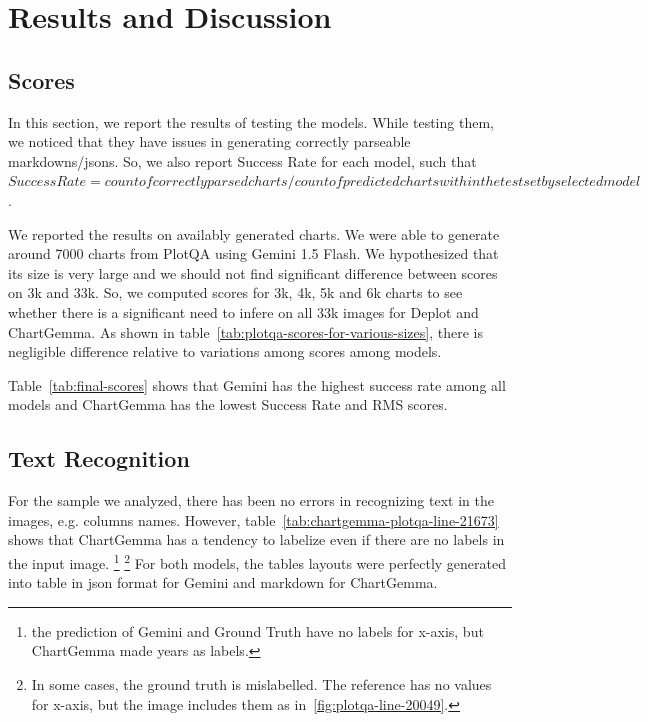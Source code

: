 \documentclass[
	letterpaper, %
]{jdf}
\begin{document}
\section{Results and Discussion}\label{sect:qualitative-analysis}
\subsection{Scores}\label{ssect:rms}
In this section, we report the results of testing the models.
While testing them, we noticed that they have issues in generating correctly parseable markdowns/jsons.
So, we also report Success Rate for each model, such that $Success Rate = count of correctly parsed charts/count of predicted charts within the testset by selected model$.

We reported the results on availably generated charts.
We were able to generate around 7000 charts from PlotQA using Gemini 1.5 Flash.
We hypothesized that its size is very large and we should not find significant difference between scores on 3k and 33k.
So, we computed scores for 3k, 4k, 5k and 6k charts to see whether there is a significant need to infere on all 33k images for Deplot and ChartGemma.
As shown in table~\ref{tab:plotqa-scores-for-various-sizes}, there is negligible difference relative to variations among scores among models.


Table~\ref{tab:final-scores} shows that Gemini has the highest success rate among all models and ChartGemma has the lowest Success Rate and RMS scores.



\subsection{Text Recognition}\label{ssect:qualitative-text-recognition}
For the sample we analyzed, there has been no errors in recognizing text in the images, e.g. columns names.
However, table~\ref{tab:chartgemma-plotqa-line-21673} shows that ChartGemma has a tendency to labelize even if there are no labels in the input image.
\footnote{the prediction of Gemini and Ground Truth have no labels for x-axis, but ChartGemma made years as labels.}
\footnote{In some cases, the ground truth is mislabelled. The reference has no values for x-axis, but the image includes them as in~\ref{fig:plotqa-line-20049}.}
For both models, the tables layouts were perfectly generated into table in json format for Gemini and markdown for ChartGemma.
\end{document}
